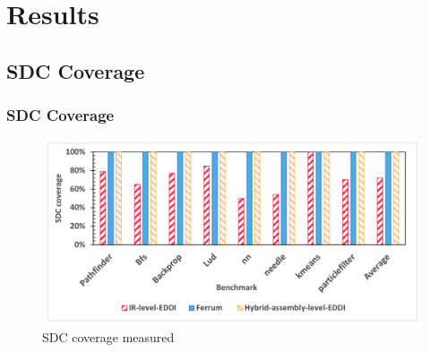 \documentclass[
	12pt, %
]{beamer}
\begin{document}
%	




\section{Results}
\subsection{SDC Coverage}

\begin{frame}
	\frametitle{SDC Coverage}
	
	\begin{figure}
		\centering
		\includegraphics[width=1\linewidth]{img7.png}
		\caption{SDC coverage measured}
		\label{SDC coverage measured}
	\end{figure}
\end{frame}
\end{document}
